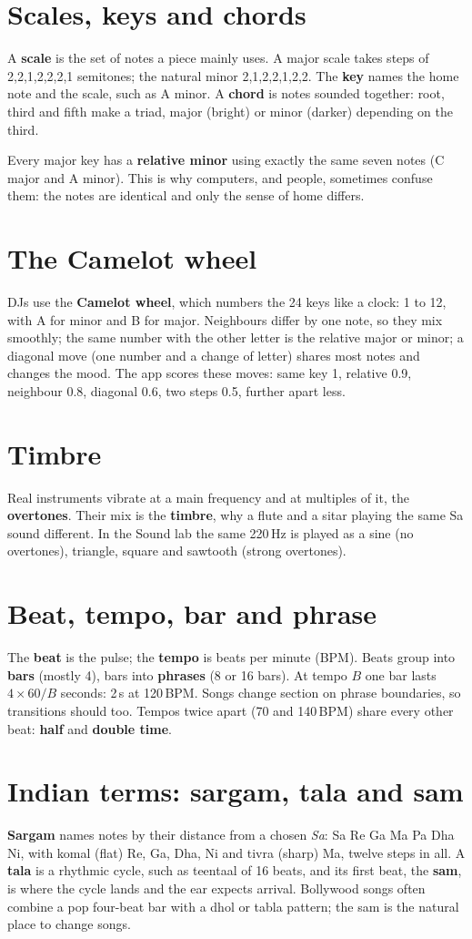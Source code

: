 \section{Scales, keys and chords}
A \textbf{scale} is the set of notes a piece mainly uses. A major scale takes steps of 2,2,1,2,2,2,1 semitones; the natural minor 2,1,2,2,1,2,2. The \textbf{key} names the home note and the scale, such as A minor. A \textbf{chord} is notes sounded together: root, third and fifth make a triad, major (bright) or minor (darker) depending on the third.

Every major key has a \textbf{relative minor} using exactly the same seven notes (C major and A minor). This is why computers, and people, sometimes confuse them: the notes are identical and only the sense of home differs.

\section{The Camelot wheel}
DJs use the \textbf{Camelot wheel}, which numbers the 24 keys like a clock: 1 to 12, with A for minor and B for major. Neighbours differ by one note, so they mix smoothly; the same number with the other letter is the relative major or minor; a diagonal move (one number and a change of letter) shares most notes and changes the mood. The app scores these moves: same key 1, relative 0.9, neighbour 0.8, diagonal 0.6, two steps 0.5, further apart less.

\section{Timbre}
Real instruments vibrate at a main frequency and at multiples of it, the \textbf{overtones}. Their mix is the \textbf{timbre}, why a flute and a sitar playing the same Sa sound different. In the Sound lab the same 220\,Hz is played as a sine (no overtones), triangle, square and sawtooth (strong overtones).

\section{Beat, tempo, bar and phrase}
The \textbf{beat} is the pulse; the \textbf{tempo} is beats per minute (BPM). Beats group into \textbf{bars} (mostly 4), bars into \textbf{phrases} (8 or 16 bars). At tempo $B$ one bar lasts $4 \times 60 / B$ seconds: 2\,s at 120\,BPM. Songs change section on phrase boundaries, so transitions should too. Tempos twice apart (70 and 140\,BPM) share every other beat: \textbf{half} and \textbf{double time}.

\section{Indian terms: sargam, tala and sam}
\textbf{Sargam} names notes by their distance from a chosen \emph{Sa}: Sa Re Ga Ma Pa Dha Ni, with komal (flat) Re, Ga, Dha, Ni and tivra (sharp) Ma, twelve steps in all. A \textbf{tala} is a rhythmic cycle, such as teentaal of 16 beats, and its first beat, the \textbf{sam}, is where the cycle lands and the ear expects arrival. Bollywood songs often combine a pop four-beat bar with a dhol or tabla pattern; the sam is the natural place to change songs.
